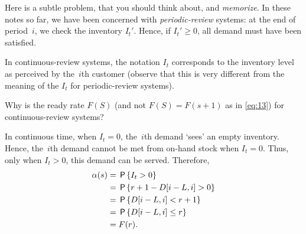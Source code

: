 \documentclass[stochastic-or.tex]{subfiles}
\begin{document}
\begin{exercise}
Here is a subtle problem, that you should think about, and \emph{memorize}.
In these notes so far, we have been concerned with \emph{periodic-review} systems: at the end of period~$i$, we check the inventory $I_t'$.
Hence, if $I_t'\geq 0$, all demand must have been satisfied.

  In continuous-review systems,  the notation $I_t$ corresponds to the inventory level as perceived by the~$i$th customer (observe that this is very different from the meaning of the $I_t$ for periodic-review systems).

  Why is the ready rate $F(S)$ (and not $F(S)=F(s+1)$ as in \cref{eq:13}) for continuous-review systems?
  \begin{solution}
    In continuous time, when $I_t=0$, the~$i$th demand `sees' an empty inventory. Hence, the~$i$th demand cannot be met from on-hand stock when $I_t=0$. Thus, only when $I_t>0$, this demand can be served. Therefore,
\begin{align*}
   \alpha(s) &= \,\mathsf{P}\left\{I_t > 0\right\} \\
   &= \,\mathsf{P}\left\{r+1 - D[i-L, i] > 0\right\} \\
   &= \,\mathsf{P}\left\{D[i-L, i] <  r+1\right\} \\
   &= \,\mathsf{P}\left\{D[i-L, i] \leq  r\right\} \\
   & = F(r).
\end{align*}
  \end{solution}
\end{exercise}


\end{document}
